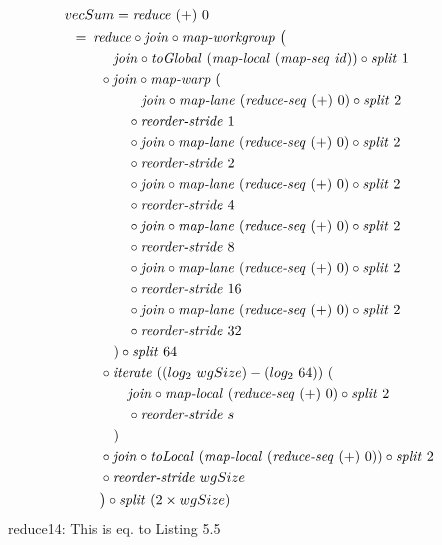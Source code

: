\begin{align}
  &\hspace{-1.5em}vecSum = \reduce\ (+)\ 0\nonumber\\
  &\hspace{-2em}\quad\begin{aligned}
    &=\hspace{.2em}
      \reduce \circ \join \circ \mapWorkgroup\ \big(\\
      &\qquad\quad \join \circ \toGlobal\ (\mapLocal\ (\mapSeq\ \id)) \circ \splitN\ 1\\
      &\qquad \circ \join \circ \mapWarp\ (\\
      &\qquad\qquad\ \ \ \join \circ \mapLane\ (\reduceSeq\ (+)\ 0) \circ \splitN\ 2\\
      &\qquad\qquad \circ \reorderStride\ 1\\
      &\qquad\qquad \circ \join \circ \mapLane\ (\reduceSeq\ (+)\ 0) \circ \splitN\ 2\\
      &\qquad\qquad \circ \reorderStride\ 2\\
      &\qquad\qquad \circ \join \circ \mapLane\ (\reduceSeq\ (+)\ 0) \circ \splitN\ 2\\
      &\qquad\qquad \circ \reorderStride\ 4\\
      &\qquad\qquad \circ \join \circ \mapLane\ (\reduceSeq\ (+)\ 0) \circ \splitN\ 2\\
      &\qquad\qquad \circ \reorderStride\ 8\\
      &\qquad\qquad \circ \join \circ \mapLane\ (\reduceSeq\ (+)\ 0) \circ \splitN\ 2\\
      &\qquad\qquad \circ \reorderStride\ 16\\
      &\qquad\qquad \circ \join \circ \mapLane\ (\reduceSeq\ (+)\ 0) \circ \splitN\ 2\\
      &\qquad\qquad \circ \reorderStride\ 32\\
      &\qquad\quad) \circ \splitN\ 64\\
      &\qquad \circ \iterateN\ ((log_2\ wgSize) - (log_2\ 64))\ (\\
      &\qquad\qquad \join \circ \mapLocal\ (\reduceSeq\ (+)\ 0) \circ \splitN\ 2\\
      &\qquad\qquad \circ \reorderStride\ s\\
      &\qquad\quad)\\
      &\qquad \circ \join \circ \toLocal\ (\mapLocal\ (\reduceSeq\ (+)\ 0)) \circ \splitN\ 2\\
      &\qquad \circ \reorderStride\ wgSize\\
      &\qquad\big) \circ \splitN\ (2\times wgSize)
  \end{aligned}
\end{align}
reduce14: This is eq. to Listing 5.5

